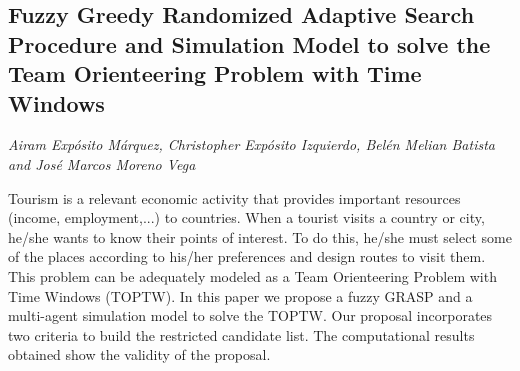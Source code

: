 \documentclass[../booklet.tex]{subfiles}
\begin{document}
\subsection[Fuzzy Greedy Randomized Adaptive Search Procedure and Simulation Model to solve the Team Orienteering Problem with Time Windows. {\it Airam Expósito Márquez, Christopher Expósito Izquierdo, Belén Melian Batista and José Marcos Moreno Vega}]{Fuzzy Greedy Randomized Adaptive Search Procedure and Simulation Model to solve the Team Orienteering Problem with Time Windows}
   

\begin{center}
  {\it Airam Expósito Márquez, Christopher Expósito Izquierdo, Belén Melian Batista and José Marcos Moreno Vega}
\end{center}

\vskip 0.8cm


Tourism is a relevant economic activity that provides important resources (income, employment,...) to countries. When a tourist visits a country or city, he/she wants to know their points of interest. To do this, he/she must select some of the places according to his/her preferences and design routes to visit them. This problem can be adequately modeled as a Team Orienteering Problem with Time Windows (TOPTW). In this paper we propose a fuzzy GRASP and a multi-agent simulation model to solve the TOPTW. Our proposal incorporates two criteria to build the restricted candidate list. The computational results obtained show the validity of the proposal.
\end{document}
